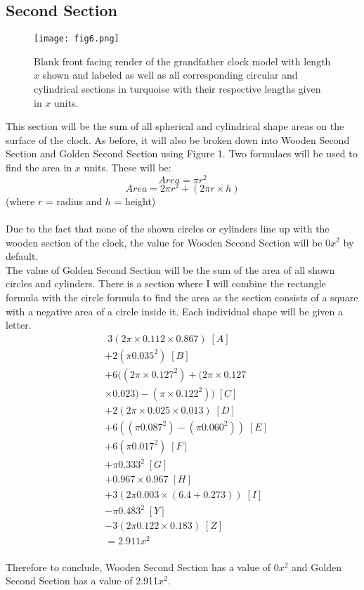 \documentclass[a4paper,12pt]{article}
\begin{document}
\subsection{Second Section}
\begin{figure}
\centering
\texttt{[image: fig6.png]}
\caption{Blank front facing render of the grandfather clock model with length $x$ shown and labeled as well as all corresponding circular and cylindrical sections in turquoise with their respective lengths given in $x$ units.}
\label{fig:clock6}
\end{figure}
This section will be the sum of all spherical and cylindrical shape areas on the surface of the clock. As before, it will also be broken down into Wooden Second Section and Golden Second Section using Figure 1. Two formulaes will be used to find the area in $x$ units. These will be: $$Area = \pi r^2$$  $$Area = 2\pi r^2 + (2\pi r\times h)$$ (where $r$ = radius and $h$ = height)
\\\\Due to the fact that none of the shown circles or cylinders line up with the wooden section of the clock, the value for Wooden Second Section will be 0$x^2$ by default. \\The value of Golden Second Section will be the sum of the area of all shown circles and cylinders. There is a section where I will combine the rectangle formula with the circle formula to find the area as the section consists of a square with a negative area of a circle inside it. Each individual shape will be given a letter.\\
\begin{equation}
\begin{aligned} 
 &\; 3(2\pi\times0.112\times0.867)\;[A]\\&+2(\pi0.035^2) \; [B]\\&+6((2\pi\times0.127^2)+(2\pi\times0.127\\&\times0.023)-(\pi\times0.122^2)) \; [C]\\&+2(2\pi\times0.025\times0.013)\;[D]\\&+6((\pi0.087^2)-(\pi0.060^2))\;[E]\\&+6(\pi0.017^2)\;[F]\\&+\pi0.333^2 \;[G]\\&+0.967\times0.967\; [H]\\&+3(2\pi0.003\times(6.4+0.273))\;[I]\\&-\pi0.483^2\; [Y]\\&-3(2\pi0.122\times0.183)\;[Z] \\&= 2.911x^2
\end{aligned}
\end{equation}
\\Therefore to conclude, Wooden Second Section has a value of 0$x^2$ and Golden Second Section has a value of 2.911$x^2$.
\end{document}
